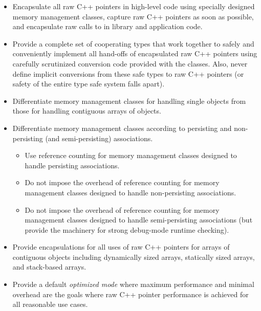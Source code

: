 \documentclass[pdf,ps2pdf,11pt]{SANDreport}
\begin{document}
\begin{itemize}

{}\item Encapsulate all raw C++ pointers in high-level code using
specially designed memory management classes, capture raw C++ pointers
as soon as possible, and encapsulate raw calls to {} in
library and application code.

{}\item Provide a complete set of cooperating types that work together
to safely and conveniently implement all hand-offs of encapsulated raw
C++ pointers using carefully scrutinized conversion code provided with
the classes.  Also, never define implicit conversions from these safe
types to raw C++ pointers (or safety of the entire type safe system
falls apart).

{}\item Differentiate memory management classes for handling single
objects from those for handling contiguous arrays of objects.

{}\item Differentiate memory management classes according to
persisting and non-persisting (and semi-persisting) associations.

  \begin{itemize}

  {}\item Use reference counting for memory management classes
  designed to handle persisting associations.

  {}\item Do not impose the overhead of reference counting for memory
  management classes designed to handle non-persisting associations.

  {}\item Do not impose the overhead of reference counting for memory
  management classes designed to handle semi-persisting associations
  (but provide the machinery for strong debug-mode runtime checking).

  \end{itemize}

{}\item Provide encapsulations for all uses of raw C++ pointers for
arrays of contiguous objects including dynamically sized arrays,
statically sized arrays, and stack-based arrays.

{}\item Provide a default {}\textit{optimized mode} where maximum
performance and minimal overhead are the goals where raw C++ pointer
performance is achieved for all reasonable use cases.


\end{itemize}
\end{document}
